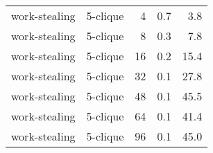 \begin{longtable}{llr|rr}
 work-stealing &  5-clique &            4 &   0.7 &      3.8 \\
 work-stealing &  5-clique &            8 &   0.3 &      7.8 \\
 work-stealing &  5-clique &           16 &   0.2 &     15.4 \\
 work-stealing &  5-clique &           32 &   0.1 &     27.8 \\
 work-stealing &  5-clique &           48 &   0.1 &     45.5 \\
 work-stealing &  5-clique &           64 &   0.1 &     41.4 \\
 work-stealing &  5-clique &           96 &   0.1 &     45.0 \\
\end{longtable}
